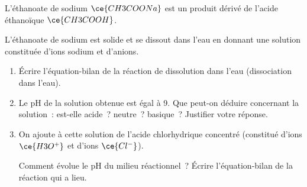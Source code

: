 
L'éthanoate de sodium $\ce{CH3COONa}$ est un produit dérivé de l'acide
éthanoïque $\ce{CH3COOH}$.

L'éthanoate de sodium est solide et se dissout dans l'eau en donnant une
solution constituée d'ions sodium et d'anions.

\begin{enumerate}
    \item Écrire l'équation-bilan de la réaction de dissolution dans l'eau
          (dissociation dans l'eau).
    \item Le pH de la solution obtenue est égal à 9. Que peut-on déduire
          concernant la solution~: est-elle acide~? neutre~? basique~? Justifier
          votre réponse.
    \item On ajoute à cette solution de l'acide chlorhydrique concentré
          (constitué d'ions $\ce{H3O^+}$ et d'ions $\ce{Cl^-}$).

          Comment évolue le pH du milieu réactionnel~? Écrire l'équation-bilan
          de la réaction qui a lieu.
\end{enumerate}
